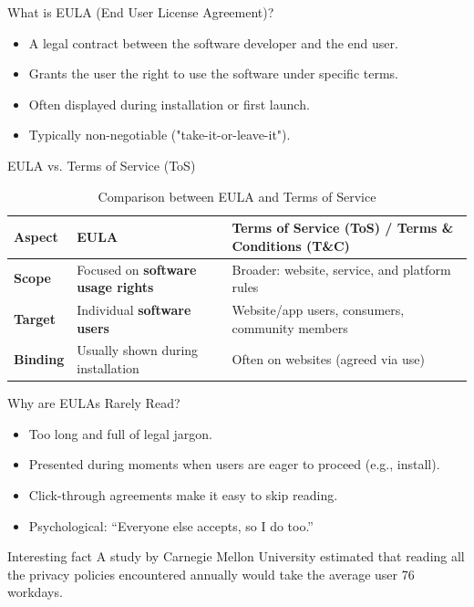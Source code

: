 
\begin{frame}{What is EULA (End User License Agreement)?}
  \begin{itemize}
    \item A legal contract between the software developer and the end user.
    \item Grants the user the right to use the software under specific terms.
    \item Often displayed during installation or first launch.
    \item Typically non-negotiable ("take-it-or-leave-it")\cite{DEFINITION}.
  \end{itemize}
\end{frame}

\begin{frame}{EULA vs. Terms of Service (ToS)}
  \begin{table}[h!]
    \centering
    \begin{tabular}{|l|p{5cm}|p{7cm}|}
    \hline
    \textbf{Aspect} & \textbf{EULA} & \textbf{Terms of Service (ToS) / Terms \& Conditions (T\&C)} \\
    \hline
    \textbf{Scope} & Focused on \textbf{software usage rights} & Broader: website, service, and platform rules \\
    \hline
    \textbf{Target} & Individual \textbf{software users} & Website/app users, consumers, community members \\
    \hline
    \textbf{Binding} & Usually shown during installation & Often on websites (agreed via use) \\
    \hline
    \end{tabular}
    \caption{Comparison between EULA and Terms of Service\cite{TOS}}
  \end{table}
\end{frame}

\begin{frame}{Why are EULAs Rarely Read?}
    \begin{itemize}
      \item Too long and full of legal jargon.
      \item Presented during moments when users are eager to proceed (e.g., install).
      \item Click-through agreements make it easy to skip reading.
      \item Psychological: “Everyone else accepts, so I do too.”\cite{RARE}
    \end{itemize}
    \begin{alertblock}{Interesting fact}
      A study by Carnegie Mellon University estimated that reading all the privacy policies encountered annually would take the average user 76 workdays\cite{FACT}.
    \end{alertblock}
\end{frame}

